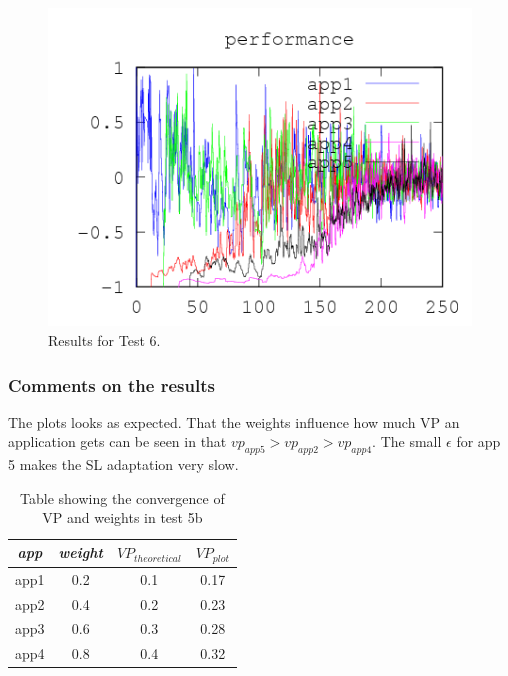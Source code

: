 \documentclass[nobiblatex]{LTHthesis}
\begin{document}
\begin{figure}[th]
\begin{minipage}{0.49\textwidth}
  \includegraphics[width=\textwidth]{"tools/plot/logs/test6/f"}
  \end{minipage}
\caption{Results for Test 6.}
\label{fig:test6}
\end{figure}


\subsubsection{Comments on the results}
The plots looks as expected. That the weights influence how much VP an
application gets can be seen in that $vp_{app5}>vp_{app2}>vp_{app4}$. 
The small $\epsilon$ for app 5 makes the SL adaptation very slow.


\begin{table}[h]
  \centering
  \begin{tabular}{|c|c|c|c|}
 	\hline 
   \emph{app} & \emph{weight} & $VP_{theoretical}$ & $VP_{plot}$  \\ \hline
	app1 & 0.2 & 0.1 & 	0.17	\\ \hline
	app2 & 0.4 & 0.2 & 	0.23 \\ \hline
	app3 & 0.6 & 0.3 & 	0.28 \\ \hline
	app4 & 0.8 & 0.4 &  0.32 \\ \hline
  \end{tabular}
  \caption{Table showing the convergence of VP and weights in test 5b}
  \label{tab:VP_test5b}
\end{table}

\end{document}
